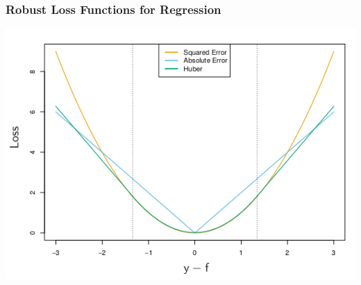 \documentclass[11pt]{article}
\begin{document}
\subsubsection{Robust Loss Functions for Regression}
\label{sec:org9cd504b}
\begin{center}
\includegraphics[width=.9\linewidth]{Boosting and Additive Trees/screenshot_2018-10-22_09-19-17.png}
\end{center}
\end{document}
